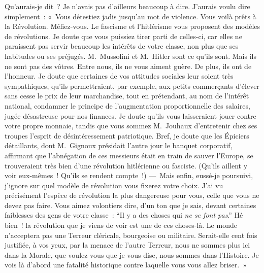 \documentclass[french,twoside]{book} %
\newcommand{\astertri}{\medskip\par\centerline{\color{rubric}\large\selectfont{\syms ✻\,✻\,✻}}\medskip\par}%
\begin{document}
Qu’aurais-je dit ? Je n’avais pas d’ailleurs beaucoup à dire. J’aurais voulu dire simplement : « Vous détestiez jadis jusqu’au mot de violence. Vous voilà prêts à la Révolution. Méfiez-vous. Le fascisme et l’hitlérisme vous proposent des modèles de révolutions. Je doute que vous puissiez tirer parti de celles-ci, car elles ne paraissent pas servir beaucoup les intérêts de votre classe, non plus que ses habitudes ou ses préjugés. M. Mussolini et M. Hitler sont ce qu’ils sont. Mais ils ne sont pas des vôtres. Entre nous, ils ne vous aiment guère. De plus, ils ont de l’honneur. Je doute que certaines de vos attitudes sociales leur soient très sympathiques, qu’ils permettraient, par exemple, aux petits commerçants d’élever sans cesse le prix de leur marchandise, tout en prétendant, au nom de l’intérêt national, condamner le principe de l’augmentation proportionnelle des salaires, jugée désastreuse pour nos finances. Je doute qu’ils vous laisseraient jouer contre votre propre monnaie, tandis que vous sommez M. Jouhaux d’entretenir chez ses troupes l’esprit de désintéressement patriotique. Bref, je doute que les Épiciers détaillants, dont M. Gignoux présidait l’autre jour le banquet corporatif, affirmant que l’abnégation de ces messieurs était en train de sauver l’Europe, se trouveraient très bien d’une révolution hitlérienne ou fasciste. (Qu’ils aillent y voir eux-mêmes ! Qu’ils se rendent compte !) — Mais enfin, eussé-je poursuivi, j’ignore sur quel modèle de révolution vous fixerez votre choix. J’ai vu précisément l’espèce de révolution la plus dangereuse pour vous, celle que vous ne devez pas faire. Vous aimez volontiers dire, d’un ton que je sais, devant certaines faiblesses des gens de votre classe : “Il y a des choses qui \emph{ne se font pas}.” Hé bien ! la révolution que je viens de voir est une de ces choses-là. Le monde n’acceptera pas une Terreur cléricale, bourgeoise ou militaire. Serait-elle cent fois justifiée, à vos yeux, par la menace de l’autre Terreur, nous ne sommes plus ici dans la Morale, que voulez-vous que je vous dise, nous sommes dans l’Histoire. Je vois là d’abord une fatalité historique contre laquelle vous vous allez briser. »\par
 \par

\astertri
\end{document}
